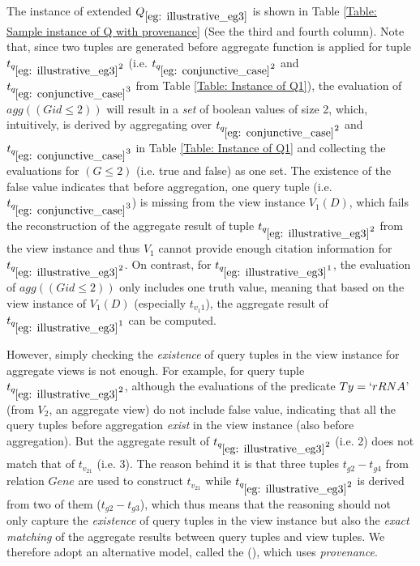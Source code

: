 \begin{example}
The instance of extended $Q_{\ref{eg: illustrative_eg3}}$ is shown in Table \ref{Table: Sample instance of Q with provenance} (See the third and fourth column). Note that, since two tuples are generated before aggregate function is applied for tuple $t_{q_{\ref{eg: illustrative_eg3}}2}$ (i.e. $t_{q_{\ref{eg: conjunctive_case}}2}$ and $t_{q_{\ref{eg: conjunctive_case}}3}$ from Table \ref{Table: Instance of Q1}), the evaluation of $agg((Gid\leq2))$ will result in a {\em set} of boolean values of size 2, which, intuitively, is derived by aggregating over $t_{q_{\ref{eg: conjunctive_case}}2}$ and $t_{q_{\ref{eg: conjunctive_case}}3}$ in Table \ref{Table: Instance of Q1} and collecting the evaluations for $(G\leq 2)$ (i.e. true and false) as one set. The existence of the false value indicates that before aggregation, one query tuple (i.e. $t_{q_{\ref{eg: conjunctive_case}}3}$) is missing from the view instance $V_1(D)$, which fails the reconstruction of the aggregate result of tuple $t_{q_{\ref{eg: illustrative_eg3}}2}$ from the view instance and thus $V_1$ cannot provide enough citation information for $t_{q_{\ref{eg: illustrative_eg3}}2}$. On contrast, for $t_{q_{\ref{eg: illustrative_eg3}}1}$, the evaluation of $agg((Gid\leq2))$ only includes one truth value, meaning that based on the view instance of $V_1(D)$ (especially $t_{{v_1}1}$), the aggregate result of $t_{q_{\ref{eg: illustrative_eg3}}1}$ can be computed.


However, simply checking the {\em existence} of query tuples in the view instance for aggregate views is not enough. For example, for query tuple $t_{q_{\ref{eg: illustrative_eg3}}2}$, although the evaluations of the predicate $Ty=`rRNA$' (from $V_2$, an aggregate view) do not include false value, indicating that all the query tuples before aggregation {\em exist} in the view instance (also before aggregation). But the aggregate result of $t_{q_{\ref{eg: illustrative_eg3}}2}$ (i.e. 2) does not match that of $t_{v_21}$ (i.e. 3). The reason behind it is that three tuples $t_{g2}-t_{g4}$ from relation $Gene$ are used to construct $t_{v_21}$ while $t_{q_{\ref{eg: illustrative_eg3}}2}$ is derived from two of them ($t_{g2}-t_{g3}$), which thus means that the reasoning should not only capture the {\em existence} of query tuples in the view instance but also the {\em exact matching} of the aggregate results between query tuples and view tuples.
We therefore adopt an alternative model, called the {\em \pbafull} ({\em \pba}), which uses {\em provenance}.


\end{example}
